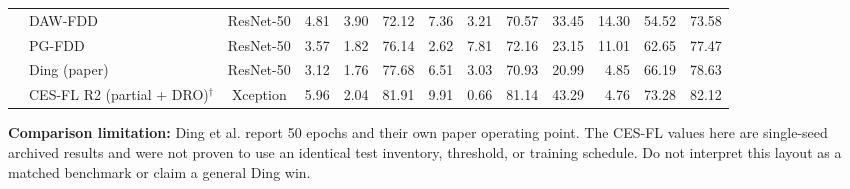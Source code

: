 \documentclass[9pt]{article}
\begin{document}
\begin{landscape}
\begin{longtable}{llc|rrr|rrr|rrr|r}
 & DAW-FDD & ResNet-50 & 4.81 & 3.90 & 72.12 & 7.36 & 3.21 & 70.57 & 33.45 & 14.30 & 54.52 & 73.58\\
 & PG-FDD & ResNet-50 & 3.57 & 1.82 & 76.14 & 2.62 & 7.81 & 72.16 & 23.15 & 11.01 & 62.65 & 77.47\\
 & Ding (paper) & ResNet-50 & 3.12 & 1.76 & 77.68 & 6.51 & 3.03 & 70.93 & 20.99 & 4.85 & 66.19 & 78.63\\
\rowcolor{blue!8} & CES-FL R2 (partial + DRO)$^{\dagger}$ & Xception & 5.96 & 2.04 & 81.91 & 9.91 & 0.66 & 81.14 & 43.29 & 4.76 & 73.28 & 82.12\\
\midrule
\end{longtable}\end{landscape}
\vspace{-6pt}{\small $\dagger$ CES-FL R2 is the single Xception row shown: partial fine-tuning + DRO, seed 17. It has the highest arithmetic mean AUC (78.68\%) across the four archived Xception test sets among the listed CES-FL arms. This is a post-hoc descriptive choice, not a preregistered model selection; the older ResNet B/C pilots are omitted. Table 3 places this Xception row after Ding et al.’s ResNet-50 rows; the backbone difference is explicit.}
\textcolor{caveat}{\textbf{Comparison limitation:} Ding et al. report 50 epochs and their own paper operating point. The CES-FL values here are single-seed archived results and were not proven to use an identical test inventory, threshold, or training schedule. Do not interpret this layout as a matched benchmark or claim a general Ding win.}
\end{document}
